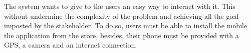 The system wants to give to the users an easy way to interact with it. This without undermine the complexity of the problem and achieving all the goal imposted by the stakeholder. To do so, users must be able to install the mobile the application from the store, besides, their phone must be provided with a GPS, a camera and an internet connection.